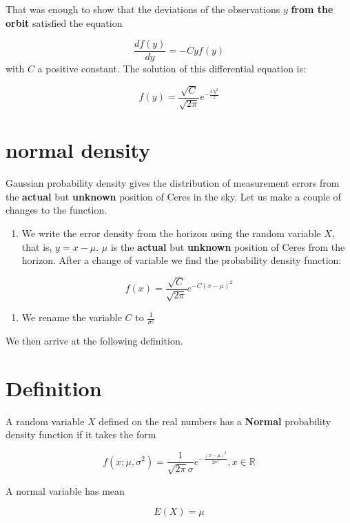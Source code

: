 \documentclass[
]{book}
\providecommand{\tightlist}{%
  \setlength{\itemsep}{0pt}\setlength{\parskip}{0pt}}
\begin{document}
That was enough to show that the deviations of the observations \(y\) \textbf{from the orbit} satisfied the equation \citep{Stahl2006}

\[\frac{df(y)}{dy}=-Cyf(y)\]
with \(C\) a positive constant. The solution of this differential equation is:

\[f(y)=\frac{\sqrt{C}}{\sqrt{2\pi}}e^{-\frac{Cy^2}{2}}\]

\hypertarget{normal-density}{%
\section{normal density}\label{normal-density}}

Gaussian probability density gives the distribution of measurement errors from the \textbf{actual} but \textbf{unknown} position of Ceres in the sky. Let us make a couple of changes to the function.

\begin{enumerate}
\def\labelenumi{\arabic{enumi})}
\tightlist
\item
  We write the error density from the horizon using the random variable \(X\), that is, \(y=x-\mu\). \(\mu\) is the \textbf{actual} but \textbf{unknown} position of Ceres from the horizon. After a change of variable we find the probability density function:
\end{enumerate}

\[f(x)=\frac{\sqrt{C}}{\sqrt{2\pi}}e^{-C(x-\mu)^2}\]

\begin{enumerate}
\def\labelenumi{\arabic{enumi})}
\setcounter{enumi}{1}
\tightlist
\item
  We rename the variable \(C\) to \(\frac{1}{\sigma^2}\)
\end{enumerate}

We then arrive at the following definition.

\hypertarget{definition}{%
\section{Definition}\label{definition}}

A random variable \(X\) defined on the real numbers has a \textbf{Normal} probability density function if it takes the form

\[f(x; \mu, \sigma^2)=\frac{1}{\sqrt{2\pi}\sigma}e^{-\frac{(x-\mu)^2}{2\sigma^2}}, x \in {\mathbb R}\]

A normal variable has mean

\[E(X) = \mu\]
\end{document}
